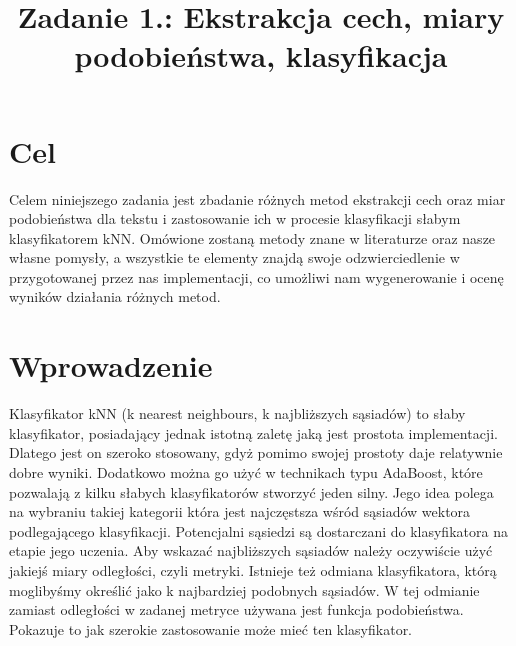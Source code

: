 \documentclass[a4paper]{classrep}
\author{%
  \studentinfo{Mateusz Grotek}{186816} \and
  \studentinfo{Paweł Tarasiuk}{186875}
}
\title{Zadanie 1.: Ekstrakcja cech, miary podobieństwa, klasyfikacja}
\begin{document}
\maketitle
\section{Cel}
Celem niniejszego zadania jest zbadanie różnych metod ekstrakcji cech
oraz miar podobieństwa dla tekstu i zastosowanie ich w procesie klasyfikacji słabym klasyfikatorem kNN.
Omówione zostaną metody znane w literaturze oraz nasze własne pomysły,
a wszystkie te elementy znajdą swoje odzwierciedlenie w przygotowanej
przez nas implementacji, co umożliwi nam wygenerowanie i ocenę wyników
działania różnych metod.
\section{Wprowadzenie}
Klasyfikator kNN (k nearest neighbours, k najbliższych sąsiadów) to słaby klasyfikator, posiadający jednak istotną zaletę jaką jest prostota implementacji.
Dlatego jest on szeroko stosowany, gdyż pomimo swojej prostoty daje relatywnie dobre wyniki. Dodatkowo można go użyć w technikach typu AdaBoost,
które pozwalają z kilku słabych klasyfikatorów stworzyć jeden silny. Jego idea polega na wybraniu takiej kategorii która jest najczęstsza wśród sąsiadów wektora podlegającego klasyfikacji.
Potencjalni sąsiedzi są dostarczani do klasyfikatora na etapie jego uczenia. Aby wskazać najbliższych sąsiadów należy oczywiście użyć jakiejś miary odległości, czyli metryki.
Istnieje też odmiana klasyfikatora, którą moglibyśmy określić jako k najbardziej podobnych sąsiadów. W tej odmianie zamiast odległości w zadanej metryce używana jest funkcja podobieństwa.
Pokazuje to jak szerokie zastosowanie może mieć ten klasyfikator.
\end{document}
